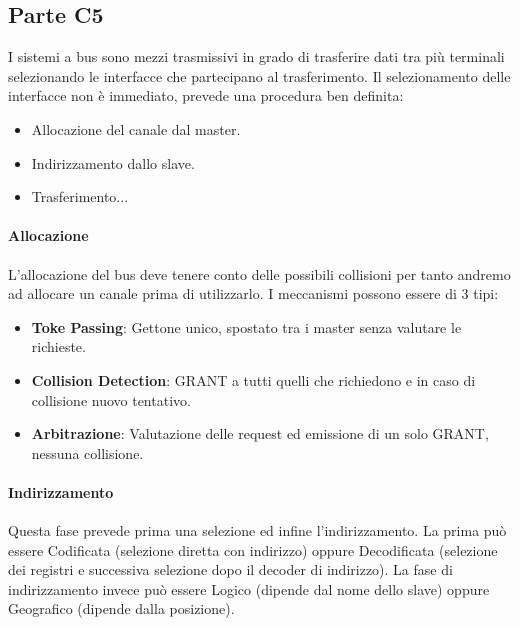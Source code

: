 \documentclass[12pt]{article}
\begin{document}
\subsection{Parte C5}\label{c5} %
I sistemi a bus sono mezzi trasmissivi in grado di trasferire dati tra più terminali selezionando le interfacce che partecipano al trasferimento. Il selezionamento delle interfacce non è immediato, prevede una procedura ben definita:
\begin{itemize}
  \item Allocazione del canale dal master.
  \item Indirizzamento dallo slave.
  \item Trasferimento...
\end{itemize}
\paragraph{Allocazione}
L'allocazione del bus deve tenere conto delle possibili collisioni per tanto andremo ad allocare un canale prima di utilizzarlo. I meccanismi possono essere di 3 tipi:
\begin{itemize}
  \item \textbf{Toke Passing}: Gettone unico, spostato tra i master senza valutare le richieste.
  \item \textbf{Collision Detection}: GRANT a tutti quelli che richiedono e in caso di collisione nuovo tentativo.
  \item \textbf{Arbitrazione}: Valutazione delle request ed emissione di un solo GRANT, nessuna collisione.
\end{itemize}
\paragraph{Indirizzamento}
Questa fase prevede prima una selezione ed infine l'indirizzamento. La prima può essere Codificata (selezione diretta con indirizzo) oppure Decodificata (selezione dei registri e successiva selezione dopo il decoder di indirizzo). La fase di indirizzamento invece può essere Logico (dipende dal nome dello slave) oppure Geografico (dipende dalla posizione).
\end{document}
